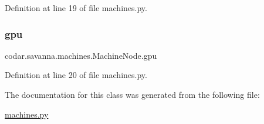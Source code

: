 Definition at line 19 of file machines.\+py.

\mbox{\label{classcodar_1_1savanna_1_1machines_1_1_machine_node_a2ccec1288c1472fc0a5af7787e48da22}} 
\subsubsection{\texorpdfstring{gpu}{gpu}}
{\footnotesize\ttfamily codar.\+savanna.\+machines.\+Machine\+Node.\+gpu}



Definition at line 20 of file machines.\+py.



The documentation for this class was generated from the following file\+:\begin{DoxyCompactItemize}
\item 
\hyperlink{machines_8py}{machines.\+py}\end{DoxyCompactItemize}
